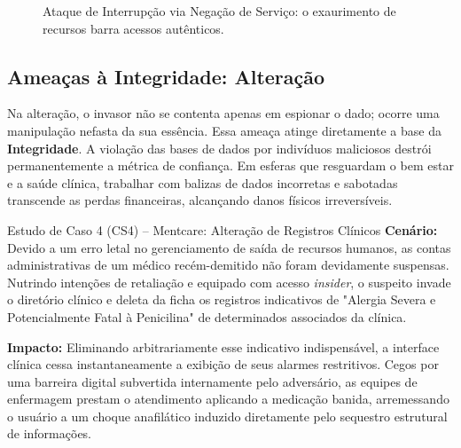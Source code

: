 \documentclass[12pt,a4paper,twoside]{report}
\begin{document}
\begin{figure}[h]
    \centering
    \caption{Ataque de Interrupção via Negação de Serviço: o exaurimento de recursos barra acessos autênticos.}
    \label{fig:ataque_dos}
\end{figure}

\subsection{Ameaças à Integridade: Alteração}
Na alteração, o invasor não se contenta apenas em espionar o dado; ocorre uma manipulação nefasta da sua essência. Essa ameaça atinge diretamente a base da \textbf{Integridade}. A violação das bases de dados por indivíduos maliciosos destrói permanentemente a métrica de confiança. Em esferas que resguardam o bem estar e a saúde clínica, trabalhar com balizas de dados incorretas e sabotadas transcende as perdas financeiras, alcançando danos físicos irreversíveis.

\begin{block}{Estudo de Caso 4 (CS4) – Mentcare: Alteração de Registros Clínicos}
\textbf{Cenário:} Devido a um erro letal no gerenciamento de saída de recursos humanos, as contas administrativas de um médico recém-demitido não foram devidamente suspensas. Nutrindo intenções de retaliação e equipado com acesso \textit{insider}, o suspeito invade o diretório clínico e deleta da ficha os registros indicativos de "Alergia Severa e Potencialmente Fatal à Penicilina" de determinados associados da clínica.

\textbf{Impacto:} Eliminando arbitrariamente esse indicativo indispensável, a interface clínica cessa instantaneamente a exibição de seus alarmes restritivos. Cegos por uma barreira digital subvertida internamente pelo adversário, as equipes de enfermagem prestam o atendimento aplicando a medicação banida, arremessando o usuário a um choque anafilático induzido diretamente pelo sequestro estrutural de informações.
\end{block}
\end{document}
